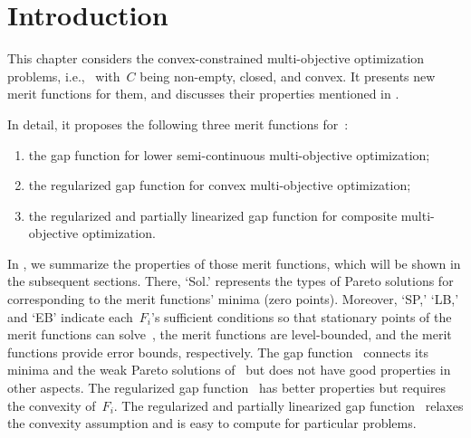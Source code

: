 \documentclass[../main]{subfiles}
\begin{document}
\section{Introduction}
This chapter considers the convex-constrained multi-objective optimization problems, i.e.,~ with~$C$ being non-empty, closed, and convex.
It presents new merit functions for them, and discusses their properties mentioned in .

In detail, it proposes the following three merit functions for~:
\begin{enumerate}
    \item the gap function for lower semi-continuous multi-objective optimization; 
    \item the regularized gap function for convex multi-objective optimization; 
    \item the regularized and partially linearized gap function for composite multi-objective optimization. 
\end{enumerate}
In , we summarize the properties of those merit functions, which will be shown in the subsequent sections.
There, `Sol.' represents the types of Pareto solutions for~ corresponding to the merit functions' minima (zero points).
Moreover, `SP,' `LB,' and `EB' indicate each~$F_i$'s sufficient conditions so that stationary points of the merit functions can solve~, the merit functions are level-bounded, and the merit functions provide error bounds, respectively.
The gap function~ connects its minima and the weak Pareto solutions of~ but does not have good properties in other aspects.
The regularized gap function~ has better properties but requires the convexity of~$F_i$.
The regularized and partially linearized gap function~ relaxes the convexity assumption and is easy to compute for particular problems.
\end{document}

